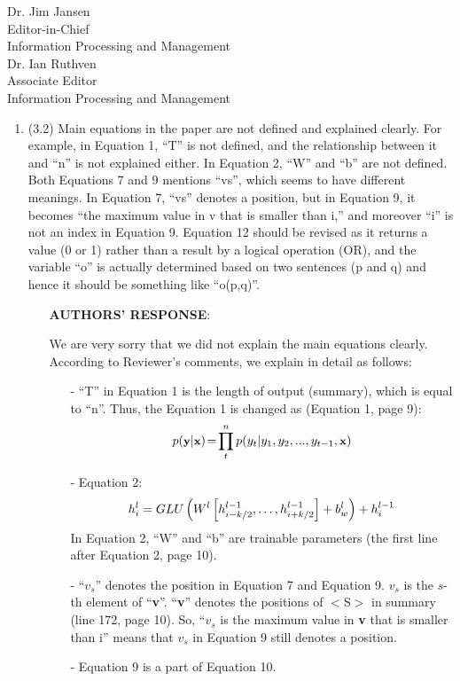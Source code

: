 \documentclass[11pt]{letter} %
\begin{document}
\begin{letter}{Dr. Jim Jansen \\
			Editor-in-Chief  \\
			Information Processing and Management\\
			Dr. Ian Ruthven \\
			Associate Editor \\
			Information Processing and Management}
\begin{enumerate}
\begin{itemize}
                \hspace*{0.6cm}
				For example,
				the statements of 
				``We expect that other natural language generation (NLG) tasks 
				with repetition problem can be enhances with our approach.''
				are changed as
				``We expect that other natural language generation (NLG) tasks 
				with repetition problem can be enhanced with our approach.''
			\end{itemize}
			\item 
			(3.2) Main equations in the paper are not defined and explained clearly. For example, in Equation 1, ``T'' is not defined, and the relationship between it and ``n'' is not explained either. In Equation 2, ``W'' and ``b'' are not defined. Both Equations 7 and 9 mentions ``vs'', which seems to have different meanings. In Equation 7, ``vs'' denotes a position, but in Equation 9, it becomes ``the maximum value in v that is smaller than i,'' and moreover ``i'' is not an index in Equation 9. Equation 12 should be revised as it returns a value (0 or 1) rather than a result by a logical operation (OR), and the variable ``o'' is actually determined based on two sentences (p and q) and hence it should be something like ``o(p,q)''.
			\begin{itemize}
				\item[] \textbf{AUTHORS' RESPONSE}: 
				
				We are very sorry that we did not explain the main equations clearly.
				According to Reviewer's comments, we explain in detail as follows:
				\begin{itemize}
				\item[-] ``T'' in Equation 1 is the length of output (summary), which is equal to ``n''.
				Thus, the Equation 1 is changed as (Equation 1, page 9):
						\begin{equation} 
						\small
						p(\textbf{y} | \textbf{x}) \!=\! {\prod^n_{t} {p(y_{t} | y_{1}, y_{2},..., y_{t-1}, \textbf{x}})} \nonumber
						\end{equation}
			    \item[-] Equation 2:
						\begin{equation}
						\small
							h _ { i } ^ { l } = GLU \left( W ^ { l } \left[ h _ {i-k/2 } ^ { l - 1 } , \ldots , h _ { i+k/2 } ^ { l - 1 } \right] + b _ { w } ^ { l } \right) + h _ { i } ^ { l - 1 } \nonumber
						\end{equation} 
				In Equation 2, ``W'' and ``b'' are trainable parameters (the first line after Equation 2, page 10).
				\item[-] ``$v_{s}$'' denotes the position in Equation 7 and Equation 9.
				$v_{s}$ is the $s$-th element of ``\textbf{v}''.
				``\textbf{v}'' denotes the positions of $<$S$>$ in summary (line 172, page 10).
				So, ``$v_{s}$ is the maximum value in \textbf{v} that is smaller than i''
				means that $v_{s}$ in Equation 9 still denotes a position.
				\item[-] Equation 9 is a part of Equation 10. 


\end{itemize}
\end{itemize}
\end{enumerate}
\end{letter}
\end{document}
